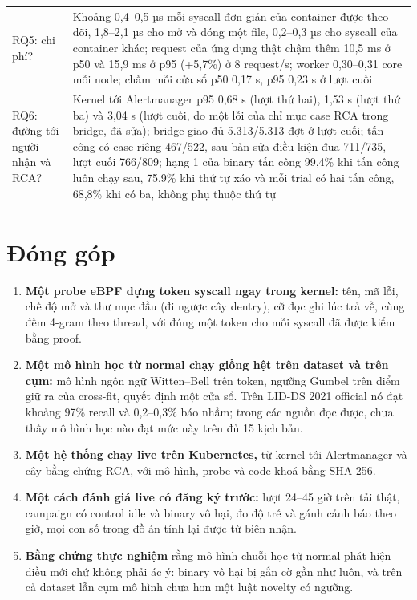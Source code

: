 \begin{longtable}[]{@{}>{\raggedright\arraybackslash}p{}>{\raggedright\arraybackslash}p{}@{}}
RQ5: chi phí? & Khoảng 0,4--0,5 µs mỗi syscall đơn giản của container được theo dõi, 1,8--2,1 µs cho mở và đóng một file, 0,2--0,3 µs cho syscall của container khác; request của ứng dụng thật chậm thêm 10,5 ms ở p50 và 15,9 ms ở p95 (+5,7\%) ở 8 request/s; worker 0,30--0,31 core mỗi node; chấm mỗi cửa sổ p50 0,17 s, p95 0,23 s ở lượt cuối \\
RQ6: đường tới người nhận và RCA? & Kernel tới Alertmanager p95 0,68 s (lượt thứ hai), 1,53 s (lượt thứ ba) và 3,04 s (lượt cuối, do một lỗi của chỉ mục case RCA trong bridge, đã sửa); bridge giao đủ 5.313/5.313 đợt ở lượt cuối; tấn công có case riêng 467/522, sau bản sửa điều kiện đua 711/735, lượt cuối 766/809; hạng 1 của binary tấn công 99,4\% khi tấn công luôn chạy sau, 75,9\% khi thứ tự xáo và mỗi trial có hai tấn công, 68,8\% khi có ba, không phụ thuộc thứ tự \\
\end{longtable}

\section{Đóng góp}

\begin{enumerate}
\def\labelenumi{\arabic{enumi}.}
\tightlist
\item
  \textbf{Một probe eBPF dựng token syscall ngay trong kernel:} tên, mã lỗi, chế độ mở và thư mục đầu (đi ngược cây dentry), cỡ đọc ghi lúc trả về, cùng đếm 4-gram theo thread, với đúng một token cho mỗi syscall đã được kiểm bằng proof.
\item
  \textbf{Một mô hình học từ normal chạy giống hệt trên dataset và trên cụm:} mô hình ngôn ngữ Witten--Bell trên token, ngưỡng Gumbel trên điểm giữ ra của cross-fit, quyết định một cửa sổ. Trên LID-DS 2021 official nó đạt khoảng 97\% recall và 0,2--0,3\% báo nhầm; trong các nguồn đọc được, chưa thấy mô hình học nào đạt mức này trên đủ 15 kịch bản.
\item
  \textbf{Một hệ thống chạy live trên Kubernetes,} từ kernel tới Alertmanager và cây bằng chứng RCA, với mô hình, probe và code khoá bằng SHA-256.
\item
  \textbf{Một cách đánh giá live có đăng ký trước:} lượt 24--45 giờ trên tải thật, campaign có control idle và binary vô hại, đo độ trễ và gánh cảnh báo theo giờ, mọi con số trong đồ án tính lại được từ biên nhận.
\item
  \textbf{Bằng chứng thực nghiệm} rằng mô hình chuỗi học từ normal phát hiện điều mới chứ không phải ác ý: binary vô hại bị gắn cờ gần như luôn, và trên cả dataset lẫn cụm mô hình chưa hơn một luật novelty có ngưỡng.
\end{enumerate}

